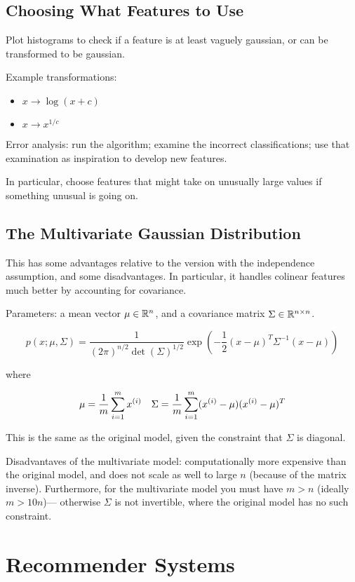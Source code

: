 \subsection{Choosing What Features to Use}

Plot histograms to check if a feature is at least vaguely gaussian,
or can be transformed to be gaussian.

Example transformations:
\begin{itemize}
    \item $x \to \log(x+c)$
    \item $x \to x^{1/c}$
\end{itemize}

Error analysis: run the algorithm;
examine the incorrect classifications;
use that examination as inspiration to develop new features.

In particular, choose features that might take on unusually large values
if something unusual is going on.

\subsection{The Multivariate Gaussian Distribution}

This has some advantages relative to the version with the independence assumption,
and some disadvantages.
In particular, it handles colinear features much better by accounting for covariance.

Parameters: a mean vector $\mu \in \mathbb{R}^n$,
and a covariance matrix $\Sigma \in \mathbb{R}^{n\times n}$.

\[
    p(x; \mu, \Sigma)
    = \frac{1}{ (2\pi)^{n/2} \det(\Sigma)^{1/2}}
      \exp( -\frac{1}{2} (x-\mu)^T \Sigma^{-1} (x-\mu))
\]

where

\[
    \mu = \frac{1}{m} \sum_{i=1}^m x_{}^{(i)}
    \quad
    \Sigma = \frac{1}{m} \sum_{i=1}^m (x_{}^{(i)} - \mu)(x_{}^{(i)} - \mu)^T
\]

This is the same as the original model, given the constraint that $\Sigma$ is diagonal.

Disadvantaves of the multivariate model:
computationally more expensive than the original model,
and does not scale as well to large $n$ (because of the matrix inverse).
Furthermore, for the multivariate model you must have $m>n$ (ideally $m>10n$)---
otherwise $\Sigma$ is not invertible, where the original model has no such constraint.

\section{Recommender Systems}

